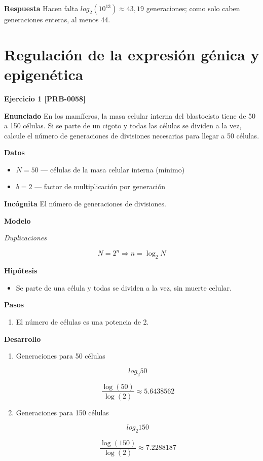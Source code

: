 \documentclass{book}
\begin{document}
\noindent\textbf{Respuesta}
Hacen falta \(log_{2}(10^{13}) \approx 43,19\) generaciones; como solo caben generaciones enteras, al menos 44.


\section{Regulación de la expresión génica y epigenética}

\noindent\textbf{Ejercicio 1 [PRB-0058]}

\noindent\textbf{Enunciado}
En los mamíferos, la masa celular interna del blastocisto tiene de 50 a 150 células. Si se parte de un cigoto y todas las células se dividen a la vez, calcule el número de generaciones de divisiones necesarias para llegar a 50 células.


\noindent\textbf{Datos}
\begin{itemize}
\item $N = 50$ — células de la masa celular interna (mínimo)
\item $b = 2$ — factor de multiplicación por generación
\end{itemize}

\noindent\textbf{Incógnita}
El número de generaciones de divisiones.


\noindent\textbf{Modelo}

\noindent\textit{Duplicaciones}

\[
N = 2^{n} \Rightarrow n = \log_2 N
\]

\noindent\textbf{Hipótesis}
\begin{itemize}
\item Se parte de una célula y todas se dividen a la vez, sin muerte celular.
\end{itemize}

\noindent\textbf{Pasos}
\begin{enumerate}
\item
El número de células es una potencia de 2.

\end{enumerate}

\noindent\textbf{Desarrollo}
\begin{enumerate}
\item
Generaciones para 50 células


\[
log_{2} 50
\]

\[
\frac{\operatorname{log}\left(50\right)}{\operatorname{log}\left(2\right)} \approx 5.6438562
\]
\item
Generaciones para 150 células


\[
log_{2} 150
\]

\[
\frac{\operatorname{log}\left(150\right)}{\operatorname{log}\left(2\right)} \approx 7.2288187
\]
\end{enumerate}
\end{document}
